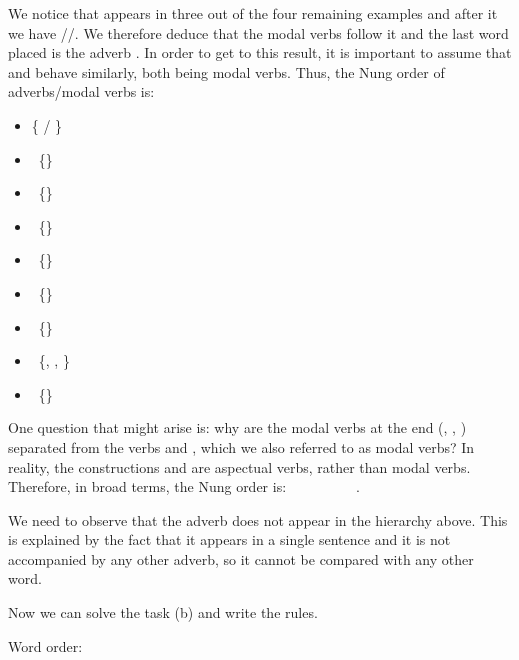 \begin{refsection}
\begin{mysolution}
We notice that  appears in three out of the four remaining examples and after it we have \slash {}\slash {}. We therefore deduce that the modal verbs follow it and the last word placed is the adverb . In order to get to this result, it is important to assume that  and  behave similarly, both being modal verbs. Thus, the Nung order of adverbs\slash modal verbs is:

\begin{itemize}[noitemsep]
    \item[] \{ / \} 
    \item[] \rightarrow\ \{\} 
    \item[] \rightarrow\ \{\} 
    \item[] \rightarrow\ \{\} 
    \item[] \rightarrow\ \{\} 
    \item[] \rightarrow\ \{\} 
    \item[] \rightarrow\ \{\} 
    \item[] \rightarrow\ \{, , \} 
    \item[] \rightarrow\ \{\}
\end{itemize}

 One question that might arise is: why are the modal verbs at the end (, , ) separated from the verbs  and , which we also referred to as modal verbs? In reality, the constructions  and  are aspectual verbs, rather than modal verbs. Therefore, in broad terms, the Nung order is:  \rightarrow\  \rightarrow\  \rightarrow\  \rightarrow\  \rightarrow\  \rightarrow\ .

We need to observe that the adverb  does not appear in the hierarchy above. This is explained by the fact that it appears in a single sentence and it is not accompanied by any other adverb, so it cannot be compared with any other word.

Now we can solve the task (b) and write the rules.


 Word order:


\end{mysolution}
\end{refsection}
